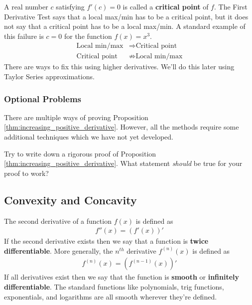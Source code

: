 A real number $c$ satisfying $f'(c) = 0$ is called a {\bf critical point} of $f$. The First Derivative Test says that a local max/min has to be a critical point, but it does not say that a critical point has to be a local max/min. A standard example of this failure is $c=0$ for the function $f(x) = x^3$.
\begin{align*}
	\mbox{Local min/max}  & \Rightarrow \mbox{Critical point}    \\
	\mbox{Critical point} & \not\Rightarrow \mbox{Local min/max}
\end{align*}
There are ways to fix this using higher derivatives. We'll do this later using Taylor Series approximations.



\subsubsection*{Optional Problems}
There are multiple ways of proving Proposition \ref{thm:increasing_positive_derivative}. However, all the methods require some additional techniques which we have not yet developed.

\begin{exercise}
	Try to write down a rigorous proof of Proposition \ref{thm:increasing_positive_derivative}. What statement {\it should} be true for your proof to work?
\end{exercise}









\subsection{Convexity and Concavity}
The second derivative of a function $f(x)$ is defined as
\begin{align*}
	f''(x) = \left(f'(x)\right)'
\end{align*}
If the second derivative exists then we say that a function is {\bf twice differentiable}.
More generally, the $n^{th}$ derivative $f^{(n)}(x)$ is defined as
\begin{align*}
	f^{(n)}(x) = \left(f^{(n-1)}(x)\right)'
\end{align*} If all derivatives exist then we say that the function is {\bf smooth} or {\bf infinitely differentiable}. The standard functions like polynomials, trig functions, exponentials, and logarithms are all smooth wherever they're defined.\\

